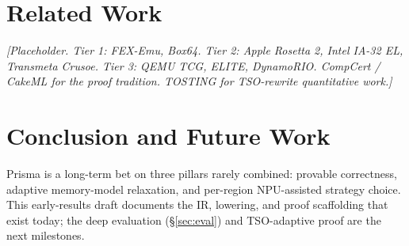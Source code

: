 \documentclass[11pt,a4paper]{article}
\begin{document}
\section{Related Work}
\label{sec:related}

\emph{[Placeholder. Tier 1: FEX-Emu, Box64. Tier 2: Apple Rosetta 2,
Intel IA-32 EL, Transmeta Crusoe. Tier 3: QEMU TCG, ELITE,
DynamoRIO. CompCert / CakeML for the proof tradition. TOSTING for
TSO-rewrite quantitative work.]}

\section{Conclusion and Future Work}
\label{sec:conc}

Prisma is a long-term bet on three pillars rarely combined:
provable correctness, adaptive memory-model relaxation, and
per-region NPU-assisted strategy choice. This early-results draft
documents the IR, lowering, and proof scaffolding that exist
today; the deep evaluation (\S\ref{sec:eval}) and TSO-adaptive
proof are the next milestones.



\end{document}
